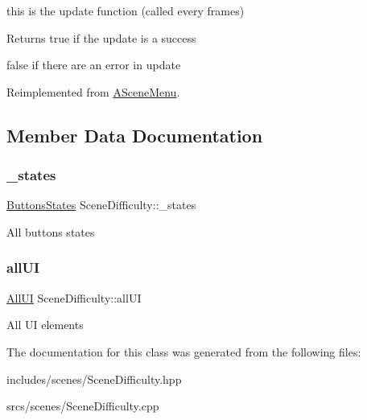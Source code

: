 this is the update function (called every frames) 

\begin{DoxyReturn}{Returns}
true if the update is a success 

false if there are an error in update 
\end{DoxyReturn}


Reimplemented from \hyperlink{class_a_scene_menu_a1deeb5fd9be97376998cd2af36f29744}{A\+Scene\+Menu}.



\subsection{Member Data Documentation}
\mbox{\label{class_scene_difficulty_a183823618eb968594b8432f9e0dfe53c}} 
\subsubsection{\texorpdfstring{\+\_\+states}{\_states}}
{\footnotesize\ttfamily \hyperlink{struct_scene_difficulty_1_1_buttons_states}{Buttons\+States} Scene\+Difficulty\+::\+\_\+states\hspace{0.3cm}{\ttfamily [protected]}}

All buttons states \mbox{\label{class_scene_difficulty_ad54978b6604447154051380bcd0ce404}} 
\subsubsection{\texorpdfstring{all\+UI}{allUI}}
{\footnotesize\ttfamily \hyperlink{struct_scene_difficulty_1_1_all_u_i}{All\+UI} Scene\+Difficulty\+::all\+UI\hspace{0.3cm}{\ttfamily [protected]}}

All UI elements 

The documentation for this class was generated from the following files\+:\begin{DoxyCompactItemize}
\item 
includes/scenes/Scene\+Difficulty.\+hpp\item 
srcs/scenes/Scene\+Difficulty.\+cpp\end{DoxyCompactItemize}
